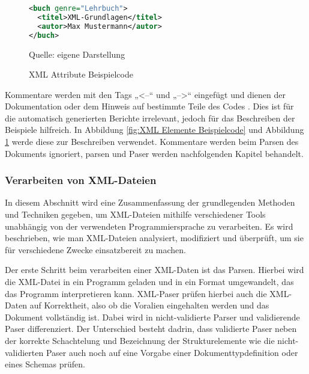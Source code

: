 \begin{figure}[H]
\centering
\begin{minipage}{0.95\textwidth}
\begin{lstlisting}[language=XML]
<buch genre="Lehrbuch">
  <titel>XML-Grundlagen</titel>
  <autor>Max Mustermann</autor>
</buch>
\end{lstlisting}
\end{minipage}
\caption{XML Attribute Beispielcode}
\label{fig:XML Attribute Beispielcode}
    {Quelle: eigene Darstellung}
\end{figure}


Kommentare werden mit den Tags „<--“ und „-->“ eingefügt und dienen der Dokumentation oder dem Hinweis auf bestimmte Teile des Codes \cite*[10-14]{Becher2022}.
Dies ist für die automatisch generierten Berichte irrelevant, jedoch für das Beschreiben der Beispiele hilfreich.
In Abbildung \ref{fig:XML Elemente Beispielcode} und Abbildung \ref{fig:XML Attribute Beispielcode} werde diese zur Beschreiben verwendet.
Kommentare werden beim Parsen des Dokuments ignoriert, parsen und Paser werden nachfolgenden Kapitel behandelt.
\subsubsection{Verarbeiten von XML-Dateien}
In diesem Abschnitt wird eine Zusammenfassung der grundlegenden Methoden und Techniken gegeben,
um \ac{XML}-Dateien mithilfe verschiedener Tools unabhängig von der verwendeten Programmiersprache zu verarbeiten.
Es wird beschrieben, wie man \ac{XML}-Dateien analysiert, modifiziert und überprüft, um sie für verschiedene Zwecke einsatzbereit zu machen.

Der erste Schritt beim verarbeiten einer \ac{XML}-Daten ist das Parsen.
Hierbei wird die \ac{XML}-Datei in ein Programm geladen und in ein Format umgewandelt, das das Programm interpretieren kann.
XML-Paser prüfen hierbei auch die \ac{XML}-Daten auf Korrektheit, also ob die Voralien eingehalten werden und das Dokument vollständig ist.
Dabei wird in nicht-validierte Parser und validierende Paser differenziert.
Der Unterschied besteht dadrin, dass validierte Paser neben der  korrekte Schachtelung und Bezeichnung der Strukturelemente
wie die nicht-validierten Paser auch noch auf eine Vorgabe einer Dokumenttypdefinition oder eines Schemas prüfen.\cite*[10]{Becher2022}


